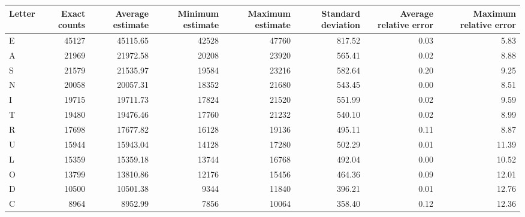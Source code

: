 \begin{tabular}{lrrrrrrr}
\toprule
Letter &  Exact counts &  Average estimate &  Minimum estimate &  Maximum estimate &  Standard deviation &  Average relative error &  Maximum relative error \\
\midrule
     E &         45127 &          45115.65 &             42528 &             47760 &              817.52 &                    0.03 &                    5.83 \\
     A &         21969 &          21972.58 &             20208 &             23920 &              565.41 &                    0.02 &                    8.88 \\
     S &         21579 &          21535.97 &             19584 &             23216 &              582.64 &                    0.20 &                    9.25 \\
     N &         20058 &          20057.31 &             18352 &             21680 &              543.45 &                    0.00 &                    8.51 \\
     I &         19715 &          19711.73 &             17824 &             21520 &              551.99 &                    0.02 &                    9.59 \\
     T &         19480 &          19476.46 &             17760 &             21232 &              540.10 &                    0.02 &                    8.99 \\
     R &         17698 &          17677.82 &             16128 &             19136 &              495.11 &                    0.11 &                    8.87 \\
     U &         15944 &          15943.04 &             14128 &             17280 &              502.29 &                    0.01 &                   11.39 \\
     L &         15359 &          15359.18 &             13744 &             16768 &              492.04 &                    0.00 &                   10.52 \\
     O &         13799 &          13810.86 &             12176 &             15456 &              464.36 &                    0.09 &                   12.01 \\
     D &         10500 &          10501.38 &              9344 &             11840 &              396.21 &                    0.01 &                   12.76 \\
     C &          8964 &           8952.99 &              7856 &             10064 &              358.40 &                    0.12 &                   12.36 \\

\end{tabular}
